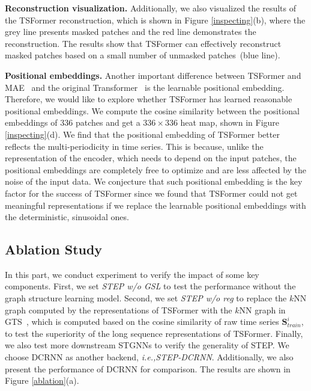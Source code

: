 \documentclass[sigconf]{acmart}
\newcommand{\ie}{\textit{i.e.,}\xspace}
\begin{document}
\noindent\textbf{Reconstruction visualization.}
Additionally, we also visualized the results of the TSFormer reconstruction, which is shown in Figure \ref{inspecting}(b), where the grey line presents masked patches and the red line demonstrates the reconstruction.
The results show that TSFormer can effectively reconstruct masked patches based on a small number of unmasked patches~(blue line).

\noindent\textbf{Positional embeddings.}
Another important difference between TSFormer and MAE~\cite{2021MAE} and the original Transformer~\cite{2017Transformer} is the learnable positional embedding. 
Therefore, we would like to explore whether TSFormer has learned reasonable positional embeddings.
We compute the cosine similarity between the positional embeddings of 336 patches and get a $336\times 336$ heat map, shown in Figure \ref{inspecting}(d).
We find that the positional embedding of TSFormer better reflects the multi-periodicity in time series.
This is because, unlike the representation of the encoder, which needs to depend on the input patches, the positional embeddings are completely free to optimize and are less affected by the noise of the input data.
We conjecture that such positional embedding is the key factor for the success of TSFormer since we found that TSFormer could not get meaningful representations if we replace the learnable positional embeddings with the deterministic, sinusoidal ones.

\vspace{-0.2cm}
\subsection{Ablation Study}
In this part, we conduct experiment to verify the impact of some key components.
First, we set \textit{STEP w/o GSL} to test the performance without the graph structure learning model.
Second, we set \textit{STEP w/o reg} to replace the $k$NN graph computed by the representations of TSFormer with the $k$NN graph in GTS~\cite{2021GTS}, which is computed based on the cosine similarity of raw time series $\mathbf{S}^{i}_{train}$, to test the superiority of the long sequence representations of TSFormer.
Finally, we also test more downstream STGNNs to verify the generality of STEP.
We choose DCRNN as another backend, \ie \textit{STEP-DCRNN}.
Additionally, we also present the performance of DCRNN for comparison.
The results are shown in Figure \ref{ablation}(a).
\end{document}
